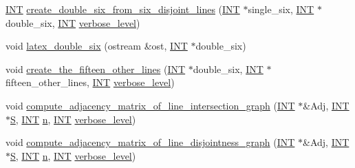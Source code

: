 \begin{DoxyCompactItemize}
\item 
\mbox{\hyperlink{galois_8h_a09fddde158a3a20bd2dcadb609de11dc}{I\+NT}} \mbox{\hyperlink{classsurface_a4c44f0a33d709edee71537547880dd87}{create\+\_\+double\+\_\+six\+\_\+from\+\_\+six\+\_\+disjoint\+\_\+lines}} (\mbox{\hyperlink{galois_8h_a09fddde158a3a20bd2dcadb609de11dc}{I\+NT}} $\ast$single\+\_\+six, \mbox{\hyperlink{galois_8h_a09fddde158a3a20bd2dcadb609de11dc}{I\+NT}} $\ast$double\+\_\+six, \mbox{\hyperlink{galois_8h_a09fddde158a3a20bd2dcadb609de11dc}{I\+NT}} \mbox{\hyperlink{simeon_8_c_a818073fbcc2f439e7c56952f67386122}{verbose\+\_\+level}})
\item 
void \mbox{\hyperlink{classsurface_a76d9d68a0475c09538a68ce7acf9cdf9}{latex\+\_\+double\+\_\+six}} (ostream \&ost, \mbox{\hyperlink{galois_8h_a09fddde158a3a20bd2dcadb609de11dc}{I\+NT}} $\ast$double\+\_\+six)
\item 
void \mbox{\hyperlink{classsurface_acd575eb608647685ff637b14f7ce82d8}{create\+\_\+the\+\_\+fifteen\+\_\+other\+\_\+lines}} (\mbox{\hyperlink{galois_8h_a09fddde158a3a20bd2dcadb609de11dc}{I\+NT}} $\ast$double\+\_\+six, \mbox{\hyperlink{galois_8h_a09fddde158a3a20bd2dcadb609de11dc}{I\+NT}} $\ast$fifteen\+\_\+other\+\_\+lines, \mbox{\hyperlink{galois_8h_a09fddde158a3a20bd2dcadb609de11dc}{I\+NT}} \mbox{\hyperlink{simeon_8_c_a818073fbcc2f439e7c56952f67386122}{verbose\+\_\+level}})
\item 
void \mbox{\hyperlink{classsurface_ac5787faa49029a5d56971271bb59f9f1}{compute\+\_\+adjacency\+\_\+matrix\+\_\+of\+\_\+line\+\_\+intersection\+\_\+graph}} (\mbox{\hyperlink{galois_8h_a09fddde158a3a20bd2dcadb609de11dc}{I\+NT}} $\ast$\&Adj, \mbox{\hyperlink{galois_8h_a09fddde158a3a20bd2dcadb609de11dc}{I\+NT}} $\ast$\mbox{\hyperlink{simeon_8_c_adab47f8243f1b5a2c31df2535d6b37d0}{S}}, \mbox{\hyperlink{galois_8h_a09fddde158a3a20bd2dcadb609de11dc}{I\+NT}} \mbox{\hyperlink{classsurface_ae1914ab225ba1a719395e88f67dd0d8c}{n}}, \mbox{\hyperlink{galois_8h_a09fddde158a3a20bd2dcadb609de11dc}{I\+NT}} \mbox{\hyperlink{simeon_8_c_a818073fbcc2f439e7c56952f67386122}{verbose\+\_\+level}})
\item 
void \mbox{\hyperlink{classsurface_ae647f9893e4d2161281845529e7bb0f5}{compute\+\_\+adjacency\+\_\+matrix\+\_\+of\+\_\+line\+\_\+disjointness\+\_\+graph}} (\mbox{\hyperlink{galois_8h_a09fddde158a3a20bd2dcadb609de11dc}{I\+NT}} $\ast$\&Adj, \mbox{\hyperlink{galois_8h_a09fddde158a3a20bd2dcadb609de11dc}{I\+NT}} $\ast$\mbox{\hyperlink{simeon_8_c_adab47f8243f1b5a2c31df2535d6b37d0}{S}}, \mbox{\hyperlink{galois_8h_a09fddde158a3a20bd2dcadb609de11dc}{I\+NT}} \mbox{\hyperlink{classsurface_ae1914ab225ba1a719395e88f67dd0d8c}{n}}, \mbox{\hyperlink{galois_8h_a09fddde158a3a20bd2dcadb609de11dc}{I\+NT}} \mbox{\hyperlink{simeon_8_c_a818073fbcc2f439e7c56952f67386122}{verbose\+\_\+level}})

\end{DoxyCompactItemize}
